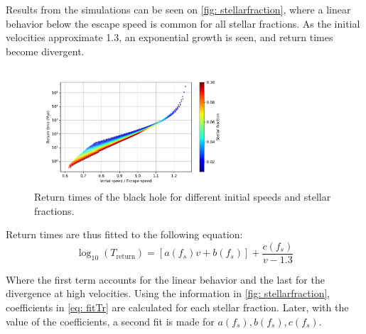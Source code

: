 		Results from the simulations can be seen on \autoref{fig: stellarfraction}, where a linear behavior below the escape speed is common for all stellar fractions. As the initial velocities approximate 1.3, an exponential growth is seen, and return times become divergent.
		\begin{figure}[h]
			\centering
			\includegraphics[width = 0.7\textwidth]{"../Files/Week 10/returntimes_speed"}
			\caption{Return times of the black hole for different initial speeds and stellar fractions.}
			\label{fig: stellarfraction}
		\end{figure}
	
		Return times are thus fitted to the following equation:
		\begin{equation}\label{eq: fitTr}
			\log_{10}(T_\text{return}) = [a(f_s) v + b(f_s)] + \dfrac{c(f_s)}{v - 1.3}
		\end{equation}
		
		Where the first term accounts for the linear behavior and the last for the divergence at high velocities. Using the information in \autoref{fig: stellarfraction}, coefficients in \autoref{eq: fitTr} are calculated for each stellar fraction. Later, with the value of the coefficients, a second fit is made for $a(f_s), b(f_s), c(f_s)$.
		
